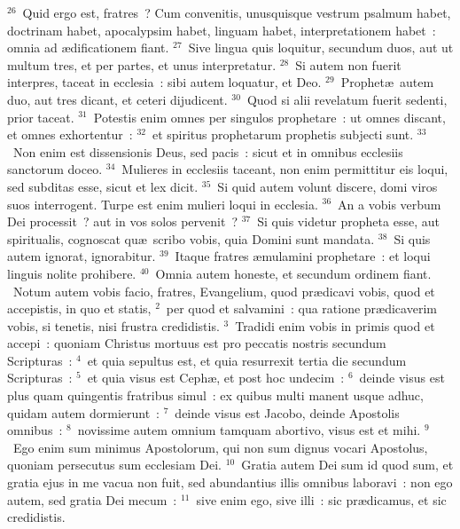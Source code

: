 ${}^{26}$~Quid ergo est, fratres~? Cum convenitis, unusquisque vestrum psalmum habet, doctrinam habet, apocalypsim habet, linguam habet, interpretationem habet~: omnia ad \ae dificationem fiant.
${}^{27}$~Sive lingua quis loquitur, secundum duos, aut ut multum tres, et per partes, et unus interpretatur.
${}^{28}$~Si autem non fuerit interpres, taceat in ecclesia~: sibi autem loquatur, et Deo.
${}^{29}$~Prophet\ae\ autem duo, aut tres dicant, et ceteri dijudicent.
${}^{30}$~Quod si alii revelatum fuerit sedenti, prior taceat.
${}^{31}$~Potestis enim omnes per singulos prophetare~: ut omnes discant, et omnes exhortentur~:
${}^{32}$~et spiritus prophetarum prophetis subjecti sunt.
${}^{33}$~Non enim est dissensionis Deus, sed pacis~: sicut et in omnibus ecclesiis sanctorum doceo.
${}^{34}$~Mulieres in ecclesiis taceant, non enim permittitur eis loqui, sed subditas esse, sicut et lex dicit.
${}^{35}$~Si quid autem volunt discere, domi viros suos interrogent. Turpe est enim mulieri loqui in ecclesia.
${}^{36}$~An a vobis verbum Dei processit~? aut in vos solos pervenit~?
${}^{37}$~Si quis videtur propheta esse, aut spiritualis, cognoscat qu\ae\ scribo vobis, quia Domini sunt mandata.
${}^{38}$~Si quis autem ignorat, ignorabitur.
${}^{39}$~Itaque fratres \ae mulamini prophetare~: et loqui linguis nolite prohibere.
${}^{40}$~Omnia autem honeste, et secundum ordinem fiant.
~Notum autem vobis facio, fratres, Evangelium, quod pr\ae dicavi vobis, quod et accepistis, in quo et statis,
${}^{2}$~per quod et salvamini~: qua ratione pr\ae dicaverim vobis, si tenetis, nisi frustra credidistis.
${}^{3}$~Tradidi enim vobis in primis quod et accepi~: quoniam Christus mortuus est pro peccatis nostris secundum Scripturas~:
${}^{4}$~et quia sepultus est, et quia resurrexit tertia die secundum Scripturas~:
${}^{5}$~et quia visus est Ceph\ae , et post hoc undecim~:
${}^{6}$~deinde visus est plus quam quingentis fratribus simul~: ex quibus multi manent usque adhuc, quidam autem dormierunt~:
${}^{7}$~deinde visus est Jacobo, deinde Apostolis omnibus~:
${}^{8}$~novissime autem omnium tamquam abortivo, visus est et mihi.
${}^{9}$~Ego enim sum minimus Apostolorum, qui non sum dignus vocari Apostolus, quoniam persecutus sum ecclesiam Dei.
${}^{10}$~Gratia autem Dei sum id quod sum, et gratia ejus in me vacua non fuit, sed abundantius illis omnibus laboravi~: non ego autem, sed gratia Dei mecum~:
${}^{11}$~sive enim ego, sive illi~: sic pr\ae dicamus, et sic credidistis.


